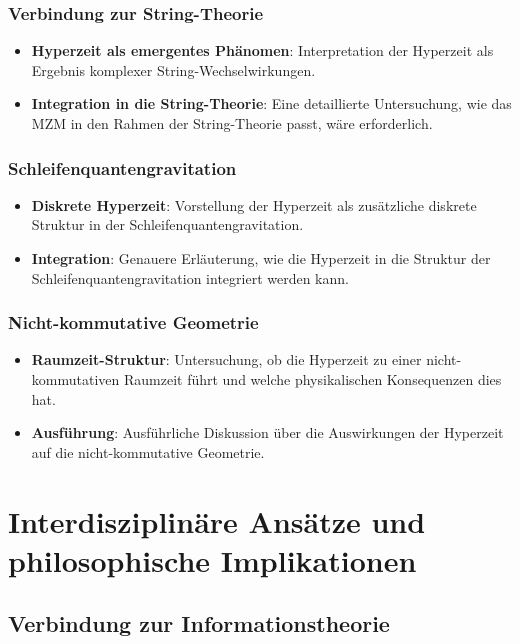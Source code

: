 \documentclass[11pt,a4paper]{article}
\begin{document}
\subsubsection{Verbindung zur String-Theorie}

\begin{itemize}
    \item \textbf{Hyperzeit als emergentes Phänomen}: Interpretation der Hyperzeit als Ergebnis komplexer String-Wechselwirkungen.
    \item \textbf{Integration in die String-Theorie}: Eine detaillierte Untersuchung, wie das MZM in den Rahmen der String-Theorie passt, wäre erforderlich.
\end{itemize}

\subsubsection{Schleifenquantengravitation}

\begin{itemize}
    \item \textbf{Diskrete Hyperzeit}: Vorstellung der Hyperzeit als zusätzliche diskrete Struktur in der Schleifenquantengravitation.
    \item \textbf{Integration}: Genauere Erläuterung, wie die Hyperzeit in die Struktur der Schleifenquantengravitation integriert werden kann.
\end{itemize}

\subsubsection{Nicht-kommutative Geometrie}

\begin{itemize}
    \item \textbf{Raumzeit-Struktur}: Untersuchung, ob die Hyperzeit zu einer nicht-kommutativen Raumzeit führt und welche physikalischen Konsequenzen dies hat.
    \item \textbf{Ausführung}: Ausführliche Diskussion über die Auswirkungen der Hyperzeit auf die nicht-kommutative Geometrie.
\end{itemize}

\section{Interdisziplinäre Ansätze und philosophische Implikationen}

\subsection{Verbindung zur Informationstheorie}
\end{document}
